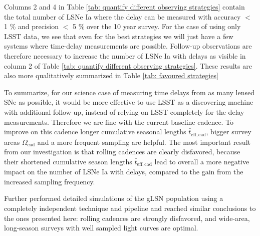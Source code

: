 Columns 2 and 4 in Table \ref{tab: quantify different observing strategies} contain the total number of LSNe Ia where the delay can be measured with accuracy $<$ 1 \% and precision $<$ 5 \% over the 10 year survey. For the case of using only LSST data, we see that even for the best strategies we will just have
a few systems where time-delay measurements are possible. Follow-up observations are therefore necessary to
increase the number of LSNe Ia with delays as visible in column 2 of Table \ref{tab: quantify different observing strategies}. These results are also more qualitatively summarized in Table \ref{tab: favoured strategies}

To summarize, for our science case of measuring time delays from as many lensed SNe as possible, it would be more effective to use LSST as a discovering machine with additional follow-up, instead of relying on LSST completely for the delay measurements. Therefore we are fine with the current baseline cadence. To improve on this cadence longer cumulative seasonal lengths $\bar{t}_\mathrm{eff,cad}$, bigger survey areas $\Omega_\mathrm{cad}$ and a more frequent sampling are helpful. The most important result from our investigation is that rolling cadences are clearly disfavored, because their shortened cumulative season lengths $\bar{t}_\mathrm{eff,cad}$ lead to overall a more negative impact on the number of LSNe Ia with delays, compared to the gain from the increased sampling frequency.

Further \cite{Goldstein:2018bue} performed detailed simulations of the gLSN population using a completely independent technique and pipeline and reached similar conclusions to the ones presented here: rolling cadences are strongly disfavored, and wide-area, long-season surveys with well sampled light curves are optimal.


